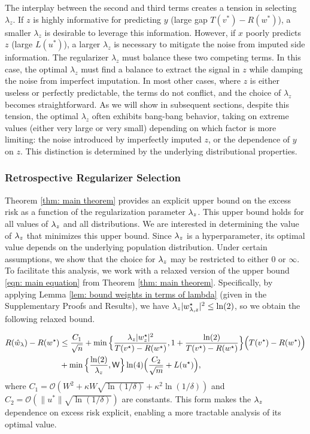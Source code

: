 The interplay between the second and third terms creates a tension in selecting $\lambda_z$. If $z$ is highly informative for predicting $y$ (large gap $T(v^*) - R(w^*)$), a smaller $\lambda_z$ is desirable to leverage this information. However, if $x$ poorly predicts $z$ (large $L(u^*)$), a larger $\lambda_z$ is necessary to mitigate the noise from imputed side information. The regularizer $\lambda_z$ must balance these two competing terms. In this case, the optimal $\lambda_z$ must find a balance to extract the signal in $z$ while damping the noise from imperfect imputation. In most other cases, where $z$ is either useless or perfectly predictable, the terms do not conflict, and the choice of $\lambda_z$ becomes straightforward. As we will show in subsequent sections, despite this tension, the optimal $\lambda_z$ often exhibits bang-bang behavior, taking on extreme values (either very large or very small) depending on which factor is more limiting: the noise introduced by imperfectly imputed $z$, or the dependence of $y$ on $z$. This distinction is determined by the underlying distributional properties.

\subsubsection{Retrospective Regularizer Selection}

Theorem \ref{thm: main theorem} provides an explicit upper bound on the excess risk as a function of the regularization parameter $\lambda_z$. This upper bound holds for all values of $\lambda_z$ and all distributions. We are interested in determining the value of $\lambda_z$ that minimizes this upper bound. Since $\lambda_z$ is a hyperparameter, its optimal value depends on the underlying population distribution. Under certain assumptions, we show that the choice for $\lambda_z$ may be restricted to either $0$ or $\infty$.
To facilitate this analysis, we work with a relaxed version of the upper bound \eqref{eqn: main equation} from Theorem \ref{thm: main theorem}. Specifically, by applying Lemma \ref{lem: bound weights in terms of lambda} (given in the Supplementary Proofs and Results), we have $\lambda_z |w^\star_{{\lambda,z}}|^2 \leq \ln(2)$, so we obtain the following relaxed bound.




\begin{equation}\label{eqn: weaker main equation}
    \begin{aligned}
        R(\hat{w}_\lambda) - R(w^\star) &\leq \frac{C_1}{\sqrt{n}} +
        \min\Big\{\frac{\lambda_z|w^\star_z|^2}{T(v^\star) - R(w^\star)},1+\frac{\ln(2)}{T(v^\star) - R(w^\star)}\Big\}\Big(T(v^\star) - R(w^\star)\Big) \\
        &+
        \min\Big\{\frac{\ln(2)}{\lambda_z},\mathsf{W}\Big\}\ln(4)\Big(\frac{C_2}{\sqrt{m}} + L(u^\star)\Big),
    \end{aligned}
\end{equation}
where $C_1 = \mathcal{O}\left( W^2 + \kappa W \sqrt{\ln(1/\delta)} + \kappa^2 \ln(1/\delta) \right)$ and $C_2 = \mathcal{O}\left( \|u^*\| \sqrt{\ln(1/\delta)} \right)$ are constants. This form makes the $\lambda_z$ dependence on excess risk explicit, enabling a more tractable analysis of its optimal value.

